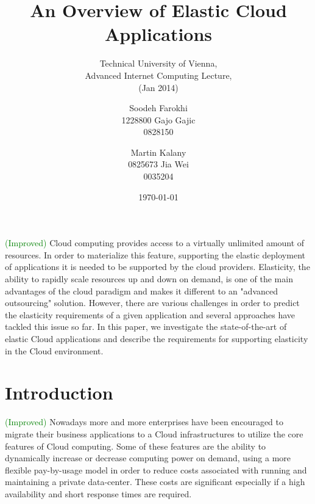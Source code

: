 \documentclass{sig-alternate}
\newcommand\todo[1]{\textcolor{red}{(#1)}}
\newcommand\done[1]{\textcolor{green}{(#1)}}
\begin{document}
\title{An Overview of Elastic Cloud Applications}
\subtitle{Technical University of Vienna,\\Advanced Internet Computing Lecture,\\
(Jan 2014)}


\author{
\alignauthor
Soodeh Farokhi\\ %
       1228800
\alignauthor
Gajo Gajic\\
       0828150
\and
\alignauthor
Martin Kalany\\
       0825673
\alignauthor
Jia Wei\\
       0035204
}
       
\date{\today}

\maketitle
\begin{abstract}
\end{abstract}
\done{Improved}
Cloud computing provides access to a virtually unlimited amount of resources. In order to materialize this feature, supporting the elastic deployment of applications it is needed to be supported by the cloud providers. Elasticity, the ability to rapidly scale resources up and down on demand, is one of the main advantages of the cloud paradigm and makes it different to an "advanced outsourcing" solution.
However, there are various challenges in order to predict the elasticity requirements of a given application and several approaches have tackled this issue so far. In this paper, we investigate the state-of-the-art of elastic Cloud applications and describe the requirements for supporting elasticity in the Cloud environment. 

\section{Introduction}
\done{Improved}
Nowadays more and more enterprises have been encouraged to migrate their business applications to a Cloud infrastructures to utilize the core features of Cloud computing. Some of these features are the ability to dynamically increase or decrease computing power on demand, using a more flexible pay-by-usage model in order to reduce costs associated with running and maintaining a private data-center. These costs are significant especially if a high availability and short response times are required. 
\end{document}
